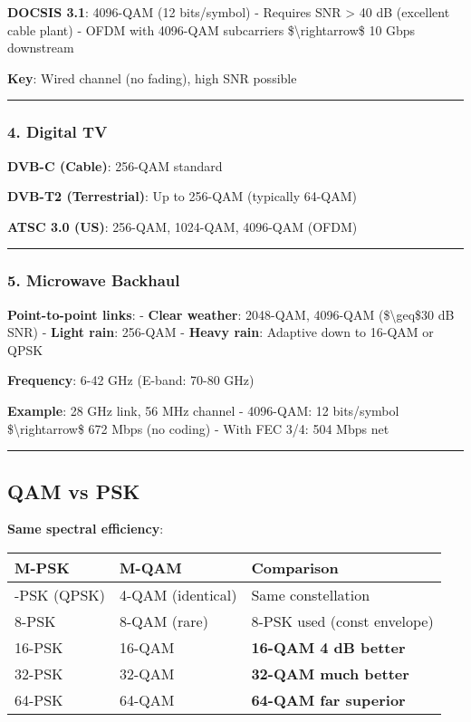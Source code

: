 \textbf{DOCSIS 3.1}: 4096-QAM (12 bits/symbol) - Requires SNR
\textgreater{} 40 dB (excellent cable plant) - OFDM with 4096-QAM
subcarriers \$\textbackslash rightarrow\$ 10 Gbps downstream

\textbf{Key}: Wired channel (no fading), high SNR possible

\begin{center}\rule{0.5\linewidth}{0.5pt}\end{center}

\subsubsection{4. Digital TV}\label{digital-tv}

\textbf{DVB-C (Cable)}: 256-QAM standard

\textbf{DVB-T2 (Terrestrial)}: Up to 256-QAM (typically 64-QAM)

\textbf{ATSC 3.0 (US)}: 256-QAM, 1024-QAM, 4096-QAM (OFDM)

\begin{center}\rule{0.5\linewidth}{0.5pt}\end{center}

\subsubsection{5. Microwave Backhaul}\label{microwave-backhaul}

\textbf{Point-to-point links}: - \textbf{Clear weather}: 2048-QAM,
4096-QAM (\$\textbackslash geq\$30 dB SNR) - \textbf{Light rain}:
256-QAM - \textbf{Heavy rain}: Adaptive down to 16-QAM or QPSK

\textbf{Frequency}: 6-42 GHz (E-band: 70-80 GHz)

\textbf{Example}: 28 GHz link, 56 MHz channel - 4096-QAM: 12 bits/symbol
\$\textbackslash rightarrow\$ 672 Mbps (no coding) - With FEC 3/4: 504
Mbps net

\begin{center}\rule{0.5\linewidth}{0.5pt}\end{center}

\subsection{QAM vs PSK}\label{qam-vs-psk}

\textbf{Same spectral efficiency}:

{\def\LTcaptype{} %
\begin{longtable}[]{@{}lll@{}}
\toprule\noalign{}
M-PSK & M-QAM & Comparison \\
\midrule\noalign{}
\endhead
\bottomrule\noalign{}
\endlastfoot
4-PSK (QPSK) & 4-QAM (identical) & Same constellation \\
8-PSK & 8-QAM (rare) & 8-PSK used (const envelope) \\
16-PSK & 16-QAM & \textbf{16-QAM 4 dB better} \\
32-PSK & 32-QAM & \textbf{32-QAM much better} \\
64-PSK & 64-QAM & \textbf{64-QAM far superior} \\
\end{longtable}
}

